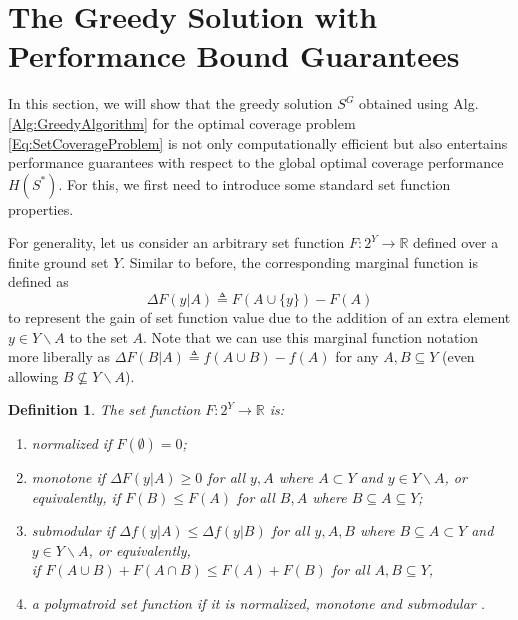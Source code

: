 \documentclass[letterpaper, 10 pt, conference]{ieeeconf}
\newcommand{\R}{\mathbb{R}}
\newtheorem{definition}{Definition}
\begin{document}
\section{The Greedy Solution with Performance Bound Guarantees}
\label{Sec:Preliminaries}


In this section, we will show that the greedy solution $S^G$ obtained using Alg. \ref{Alg:GreedyAlgorithm} for the optimal coverage problem \eqref{Eq:SetCoverageProblem} is not only computationally efficient but also entertains performance guarantees with respect to the global optimal coverage performance $H(S^*)$. For this, we first need to introduce some standard set function properties.

For generality, let us consider an arbitrary set function $F:2^Y \rightarrow \R$ defined over a finite ground set $Y$. Similar to before, the corresponding marginal function is defined as 
\begin{equation}
    \Delta F(y \vert A) \triangleq F(A\cup\{y\}) - F(A)
\end{equation}
to represent the gain of set function value due to the addition of an extra element $y \in Y \backslash A$ to the set $A$. Note that we can use this marginal function notation more liberally as $\Delta F(B \vert A) \triangleq f(A\cup B) - f(A)$ for any $A, B \subseteq Y$ (even allowing $B \not\subseteq Y\backslash A$).  


\begin{definition} \cite{WelikalaJ02021} \label{Def:Submodularity} The set function $F:2^Y \rightarrow \R$ is:
\begin{enumerate}
    \item \emph{normalized} if $F(\emptyset) = 0$;
    \item \emph{monotone} if $\Delta F(y \vert A)\geq 0$ for all $y,A$ where $A \subset Y$ and $y\in Y\backslash A$, or equivalently, if $F(B) \leq F(A)$ for all $B,A$ where $B \subseteq A \subseteq Y$;
    \item \emph{submodular} if $\Delta f(y\vert A) \leq \Delta f(y\vert B)$ for all $y,A,B$ where $B\subseteq A \subset Y$ and $y\in Y \backslash A$, or equivalently, \\if $F(A\cup B) + F(A\cap B) \leq F(A) + F(B)$ for all $A,B\subseteq Y$,
    \item a \emph{polymatroid} set function if it is normalized, monotone and submodular \cite{Liu2018,Boros2003}. 
\end{enumerate}
\end{definition}
\end{document}
